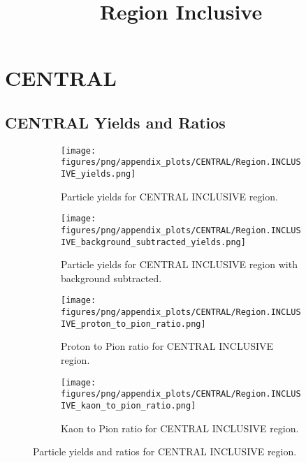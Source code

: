     
        \section{CENTRAL}
        
                \subsection*{CENTRAL Yields and Ratios}
                \begin{figure}[H]
                    \title{Region Inclusive}
                    \begin{subfigure}[b]{0.5\textwidth}
                        \centering
                        \texttt{[image: figures/png/appendix\_plots/CENTRAL/Region.INCLUSIVE\_yields.png]}
                        \caption{Particle yields for CENTRAL INCLUSIVE region.}
                        \label{fig:appendix_CENTRAL_INCLUSIVE_Inclusive_Yields}
                    \end{subfigure}
                    \begin{subfigure}[b]{0.5\textwidth}
                        \centering
                        \texttt{[image: figures/png/appendix\_plots/CENTRAL/Region.INCLUSIVE\_background\_subtracted\_yields.png]}
                        \caption{Particle yields for CENTRAL INCLUSIVE region with background subtracted.}
                        \label{fig:appendix_CENTRAL_INCLUSIVE_Inclusive_Yields_Background_Subtracted}
                    \end{subfigure}
                    \begin{subfigure}[b]{0.5\textwidth}
                        \centering
                        \texttt{[image: figures/png/appendix\_plots/CENTRAL/Region.INCLUSIVE\_proton\_to\_pion\_ratio.png]}
                        \caption{Proton to Pion ratio for CENTRAL INCLUSIVE region.}
                        \label{fig:appendix_CENTRAL_INCLUSIVE_Proton_to_Pion_Ratio}
                    \end{subfigure}
                    \begin{subfigure}[b]{0.5\textwidth}
                        \centering
                        \texttt{[image: figures/png/appendix\_plots/CENTRAL/Region.INCLUSIVE\_kaon\_to\_pion\_ratio.png]}
                        \caption{Kaon to Pion ratio for CENTRAL INCLUSIVE region.}
                        \label{fig:appendix_CENTRAL_INCLUSIVE_Kaon_to_Pion_Ratio}
                    \end{subfigure}
                    \caption{Particle yields and ratios for CENTRAL INCLUSIVE region.}
                    \label{fig:appendix_CENTRAL_INCLUSIVE_Inclusive_Yields_and_Ratios}
                \end{figure}
